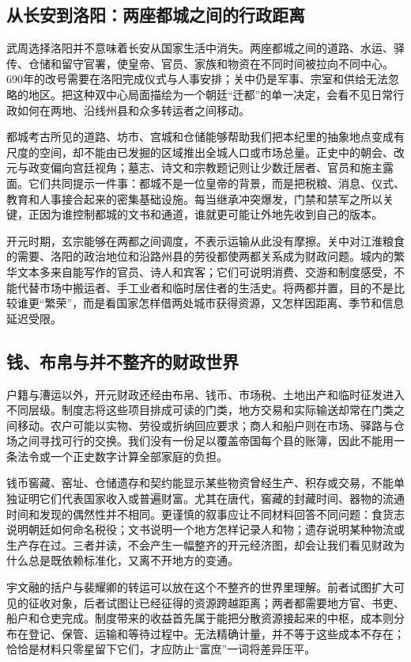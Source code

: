 \subsection{从长安到洛阳：两座都城之间的行政距离}
武周选择洛阳并不意味着长安从国家生活中消失。两座都城之间的道路、水运、驿传、仓储和留守官署，使皇帝、官员、家族和物资在不同时间被拉向不同中心。690年的改号需要在洛阳完成仪式与人事安排；关中仍是军事、宗室和供给无法忽略的地区。把这种双中心局面描绘为一个朝廷“迁都”的单一决定，会看不见日常行政如何在两地、沿线州县和众多转运者之间移动。

都城考古所见的道路、坊市、宫城和仓储能够帮助我们把本纪里的抽象地点变成有尺度的空间，却不能由已发掘的区域推出全城人口或市场总量。正史中的朝会、改元与政变偏向宫廷视角；墓志、诗文和宗教题记则让少数迁居者、官员和施主露面。它们共同提示一件事：都城不是一位皇帝的背景，而是把税粮、消息、仪式、教育和人事接合起来的密集基础设施。每当继承冲突爆发，门禁和禁军之所以关键，正因为谁控制都城的文书和通道，谁就更可能让外地先收到自己的版本。

开元时期，玄宗能够在两都之间调度，不表示运输从此没有摩擦。关中对江淮粮食的需要、洛阳的政治地位和沿路州县的劳役都使两都关系成为财政问题。城内的繁华文本多来自能写作的官员、诗人和宾客；它们可说明消费、交游和制度感受，不能代替市场中搬运者、手工业者和临时居住者的生活史。将两都并置，目的不是比较谁更“繁荣”，而是看国家怎样借两处城市获得资源，又怎样因距离、季节和信息延迟受限。

\subsection{钱、布帛与并不整齐的财政世界}
户籍与漕运以外，开元财政还经由布帛、钱币、市场税、土地出产和临时征发进入不同层级。制度志将这些项目排成可读的门类，地方交易和实际输送却常在门类之间移动。农户可能以实物、劳役或折纳回应要求；商人和船户则在市场、驿路与仓场之间寻找可行的交换。我们没有一份足以覆盖帝国每个县的账簿，因此不能用一条法令或一个正史数字计算全部家庭的负担。

钱币窖藏、窑址、仓储遗存和契约能显示某些物资曾经生产、积存或交易，不能单独证明它们代表国家收入或普遍财富。尤其在唐代，窖藏的封藏时间、器物的流通时间和发现的偶然性并不相同。更谨慎的叙事应让不同材料回答不同问题：食货志说明朝廷如何命名税役；文书说明一个地方怎样记录人和物；遗存说明某种物流或生产存在过。三者并读，不会产生一幅整齐的开元经济图，却会让我们看见财政为什么总是既依赖标准化，又离不开地方的变通。

宇文融的括户与裴耀卿的转运可以放在这个不整齐的世界里理解。前者试图扩大可见的征收对象，后者试图让已经征得的资源跨越距离；两者都需要地方官、书吏、船户和仓吏完成。制度带来的收益首先属于能把分散资源接起来的中枢，成本则分布在登记、保管、运输和等待过程中。无法精确计量，并不等于这些成本不存在；恰恰是材料只零星留下它们，才应防止“富庶”一词将差异压平。

